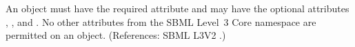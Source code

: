 An \EventAssignment object must have the required attribute
 and may have the optional attributes , ,  and
.  No other attributes from the SBML Level~3 Core namespace
are permitted on an \EventAssignment object.  (References: SBML L3V2
.)
